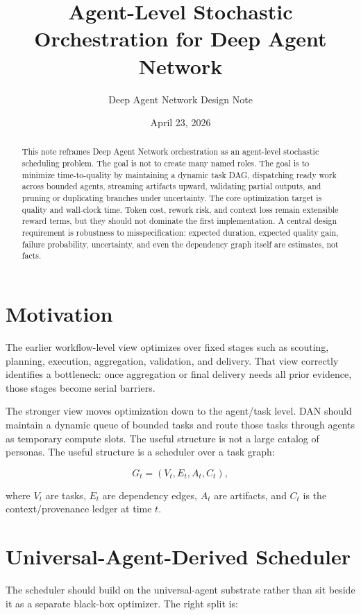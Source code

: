 \documentclass[11pt]{article}
\title{Agent-Level Stochastic Orchestration for Deep Agent Network}
\author{Deep Agent Network Design Note}
\date{April 23, 2026}
\begin{document}
\maketitle

\begin{abstract}
This note reframes Deep Agent Network orchestration as an agent-level stochastic scheduling problem. The goal is not to create many named roles. The goal is to minimize time-to-quality by maintaining a dynamic task DAG, dispatching ready work across bounded agents, streaming artifacts upward, validating partial outputs, and pruning or duplicating branches under uncertainty. The core optimization target is quality and wall-clock time. Token cost, rework risk, and context loss remain extensible reward terms, but they should not dominate the first implementation. A central design requirement is robustness to misspecification: expected duration, expected quality gain, failure probability, uncertainty, and even the dependency graph itself are estimates, not facts.
\end{abstract}

\section{Motivation}

The earlier workflow-level view optimizes over fixed stages such as scouting, planning, execution, aggregation, validation, and delivery. That view correctly identifies a bottleneck: once aggregation or final delivery needs all prior evidence, those stages become serial barriers.

The stronger view moves optimization down to the agent/task level. DAN should maintain a dynamic queue of bounded tasks and route those tasks through agents as temporary compute slots. The useful structure is not a large catalog of personas. The useful structure is a scheduler over a task graph:

\[
G_t = (V_t, E_t, A_t, C_t),
\]

where $V_t$ are tasks, $E_t$ are dependency edges, $A_t$ are artifacts, and $C_t$ is the context/provenance ledger at time $t$.

\section{Universal-Agent-Derived Scheduler}

The scheduler should build on the universal-agent substrate rather than sit beside it as a separate black-box optimizer. The right split is:
\end{document}
